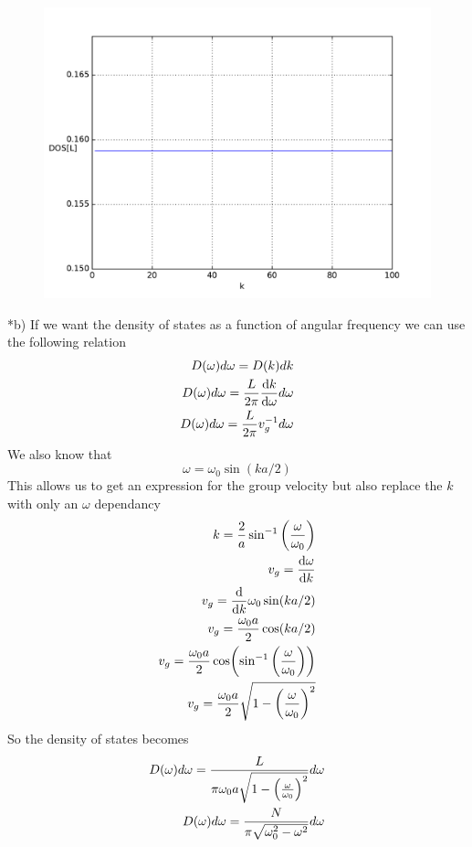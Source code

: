 \documentclass[a4paper]{article}
\begin{document}
\begin{section}
\begin{subsection}
		\begin{figure}[H]
			\includegraphics[width = 0.8\linewidth]{2a.pdf}
			\centering
		\end{figure}
	\end{subsection}
	\begin{subsection}*{b)}
		If we want the density of states as a function of angular frequency we can use the following relation
		\begin{align*}
			D(\omega)d\omega = D(k)dk\\
			D(\omega)d\omega = \frac{L}{2\pi}\dv{k}{\omega}d\omega\\
			D(\omega)d\omega = \frac{L}{2\pi}v_g^{-1}d\omega\\
		\end{align*}
		We also know that
		$$\omega = \omega_0\sin(ka/2)$$
		This allows us to get an expression for the group velocity but also replace the $k$ with only an $\omega$ dependancy
		\begin{align*}
			k = \frac{2}{a}\sin^{-1}\qty(\frac{\omega}{\omega_0})\\
			v_g = \dv{\omega}{k} \\
			v_g= \dv{k}\omega_0\sin(ka/2)\\
			v_g=\frac{\omega_0a}{2}\cos(ka/2)\\
			v_g=\frac{\omega_0a}{2}\cos(\sin^{-1}\qty(\frac{\omega}{\omega_0}))\\
			v_g = \frac{\omega_0a}{2}\sqrt{1-\qty(\frac{\omega}{\omega_0})^2}
		\end{align*}
		So the density of states becomes
		\begin{align*}
			D(\omega)d\omega = \frac{L}{ \pi\omega_0a\sqrt{1-\qty(\frac{\omega}{\omega_0})^2} } d\omega\\
			D(\omega)d\omega = \frac{N}{ \pi\sqrt{\omega_0^2-\omega^2} } d\omega

\end{align*}
\end{subsection}
\end{section}
\end{document}
